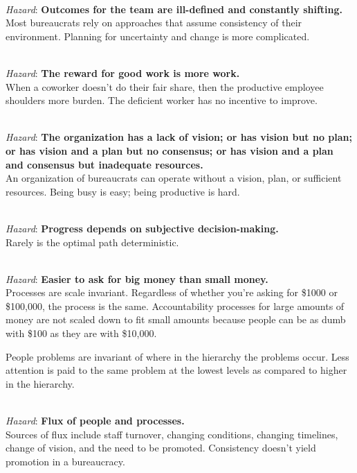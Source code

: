 \ \\
\textit{Hazard}: \textbf{Outcomes for the team are ill-defined and constantly shifting.}\\
Most bureaucrats rely on approaches that assume consistency of their environment. Planning for uncertainty and change is more complicated.

\ \\
\textit{Hazard}: \textbf{The reward for good work is more work.}\\
When a coworker doesn't do their fair share, then the productive employee shoulders more burden. The deficient worker has no incentive to improve.

\ \\
\textit{Hazard}: \textbf{The organization has a lack of vision; or has vision but no plan; or has vision and a plan but no consensus; or has vision and a plan and consensus but inadequate resources.}\\
An organization of bureaucrats can operate without a vision, plan, or sufficient resources. Being busy is easy; being productive is hard.

\ \\
\textit{Hazard}: \textbf{Progress depends on subjective decision-making.}\\
Rarely is the optimal path deterministic. 

\ \\
\textit{Hazard}: \textbf{Easier to ask for big money than small money.}\\
Processes are scale invariant. Regardless of whether you're asking for \$1000 or \$100,000, the process is the same. Accountability processes for large amounts of money are not scaled down to fit small amounts because people can be as dumb with \$100 as they are with \$10,000.


People problems are invariant of where in the hierarchy the problems occur. Less attention is paid to the same problem at the lowest levels as compared to higher in the hierarchy.


\ \\
\textit{Hazard}: \textbf{Flux of people and processes.} \\
Sources of flux include staff turnover, changing conditions, changing timelines, change of vision, and the need to be promoted. Consistency doesn't yield promotion in a bureaucracy.

